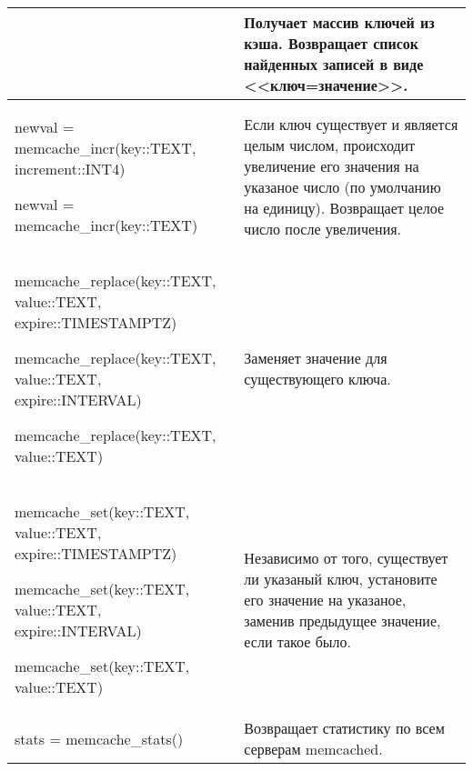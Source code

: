 \begin{table}[h]
\begin{tabular}{| >{\raggedright\scriptsize}p{7cm}| >{\scriptsize}p{7cm} |}
& 
Получает массив ключей из кэша.
Возвращает список найденных записей в виде <<ключ=значение>>.\\

\hline

newval = memcache\_incr(key::TEXT, increment::INT4)

newval = memcache\_incr(key::TEXT)

& 
Если ключ существует и является целым числом, происходит увеличение 
его значения на указаное число (по умолчанию на единицу). 
Возвращает целое число после увеличения.\\

\hline

memcache\_replace(key::TEXT, value::TEXT, expire::TIMESTAMPTZ)

memcache\_replace(key::TEXT, value::TEXT, expire::INTERVAL)

memcache\_replace(key::TEXT, value::TEXT)

& 
Заменяет значение для существующего ключа.\\

\hline

memcache\_set(key::TEXT, value::TEXT, expire::TIMESTAMPTZ)

memcache\_set(key::TEXT, value::TEXT, expire::INTERVAL)

memcache\_set(key::TEXT, value::TEXT)

& 
Независимо от того, существует ли указаный ключ, установите его значение на указаное, заменив предыдущее значение, если такое было.\\

\hline

stats = memcache\_stats()

& 
Возвращает статистику по всем серверам memcached.\\

\hline
\end{tabular}
\end{table}